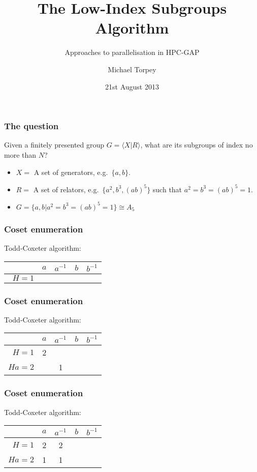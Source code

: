 \documentclass{beamer}
\title{The Low-Index Subgroups Algorithm}
\subtitle{Approaches to parallelisation in HPC-GAP}
\author{Michael Torpey}
\institute{University of St Andrews}
\date{21st August 2013}
\begin{document}
\maketitle

\begin{frame}
  \frametitle{The question}
  Given a finitely presented group $G = \langle X | R \rangle$, what are its subgroups of index no more than $N$?
  \begin{itemize}
  \item<2-> $X = $ A set of generators, e.g.~$\{a,b\}$.
  \item<3-> $R = $ A set of relators, e.g.~$\{a^2,b^3,(ab)^5\}$ such that $a^2=b^3=(ab)^5=1$.
  \item<4-> $G = \{a,b | a^2=b^3=(ab)^5=1\} \cong A_5$
  \end{itemize}
\end{frame}

\begin{frame}[t]
  \frametitle{Coset enumeration}
  \pause
  Todd-Coxeter algorithm:
  \pause
  \begin{table}
    \begin{tabular}{r | c c c c}
      & $a$ & $a^{-1}$ & $b$ & $b^{-1}$ \\ \hline
      $\phantom{a}H=1$ & & & 
    \end{tabular}
  \end{table}

\end{frame}

\begin{frame}[t]
  \frametitle{Coset enumeration}
  Todd-Coxeter algorithm:
\begin{table}
  \begin{tabular}{r | c c c c}
    & $a$ & $a^{-1}$ & $b$ & $b^{-1}$ \\ \hline
    $H=1$ & 2 & & \\
    $Ha=2$ & & 1 & & 
  \end{tabular}
\end{table}
\end{frame}

\begin{frame}[t]
  \frametitle{Coset enumeration}
  Todd-Coxeter algorithm:
\begin{table}
  \begin{tabular}{r | c c c c}
    & $a$ & $a^{-1}$ & $b$ & $b^{-1}$ \\ \hline
    $H=1$ & 2 & 2 & \\
    $Ha=2$ & 1 & 1 & & 
  \end{tabular}
\end{table}
\end{frame}
\end{document}
